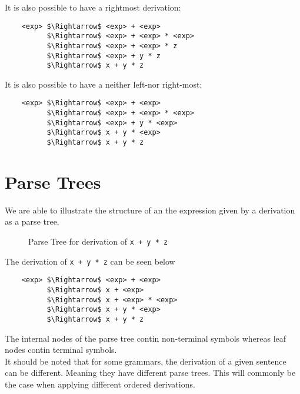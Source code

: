 It is also possible to have a rightmost derivation:
\begin{lstlisting}
    <exp> $\Rightarrow$ <exp> + <exp>
          $\Rightarrow$ <exp> + <exp> * <exp>
          $\Rightarrow$ <exp> + <exp> * z
          $\Rightarrow$ <exp> + y * z
          $\Rightarrow$ x + y * z
\end{lstlisting}

It is also possible to have a neither left-nor right-most:
\begin{lstlisting}
    <exp> $\Rightarrow$ <exp> + <exp>
          $\Rightarrow$ <exp> + <exp> * <exp>
          $\Rightarrow$ <exp> + y * <exp>
          $\Rightarrow$ x + y * <exp>
          $\Rightarrow$ x + y * z
\end{lstlisting}

\section{Parse Trees}
We are able to illustrate the structure of an the expression given by a derivation as a parse tree.
\begin{figure}[H]
\centering
{}
\caption{Parse Tree for derivation of \texttt{x + y * z}}
\end{figure}

The derivation of \verb|x + y * z| can be seen below
\begin{lstlisting}
    <exp> $\Rightarrow$ <exp> + <exp>
          $\Rightarrow$ x + <exp>
          $\Rightarrow$ x + <exp> * <exp>
          $\Rightarrow$ x + y * <exp>
          $\Rightarrow$ x + y * z
\end{lstlisting}

The internal nodes of the parse tree contin non-terminal symbols whereas leaf nodes contin terminal symbols. \\

It should be noted that for some grammars, the derivation of a given sentence can be different. Meaning they have different parse trees. This will commonly be the case when applying different ordered derivations.